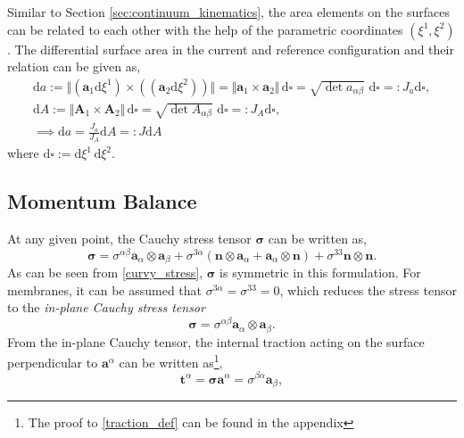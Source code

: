 \documentclass[../main.tex]{subfiles}
\begin{document}
Similar to Section \ref{sec:continuum_kinematics}, the area elements on the surfaces can be related to each other
 with the help of the parametric coordinates $(\xi^{1}, \xi^{2})$. The differential surface area in the current and reference configuration and their relation can be given as,
 \begin{gather} \label{area_something_man}
    \mathrm{d}a := \Vert (\boldsymbol{a}_{1} \mathrm{d}\xi^{1}) \times ((\boldsymbol{a}_{2} \mathrm{d}\xi^{2})) \Vert = \Vert \boldsymbol{a}_{1} \times \boldsymbol{a}_{2} \Vert\, \mathrm{d}\square = \sqrt{\det a_{\alpha \beta}}\,\, \mathrm{d}\square =: J_{a} \mathrm{d}\square,\\
    \mathrm{d}A := \Vert \boldsymbol{A}_{1} \times \boldsymbol{A}_{2} \Vert \, \mathrm{d}\square = \sqrt{\det A_{\alpha \beta}}\,\, \mathrm{d}\square =: J_{A} \mathrm{d}\square,\\    
    \implies \mathrm{d}a = \frac{J_{a}}{J_{A}} \mathrm{d}A =: J \mathrm{d}A
\end{gather}
 where $\mathrm{d} \square := \mathrm{d} \xi^{1} \, \mathrm{d} \xi^{2}$. 
\subsection{Momentum Balance}
At any given point, the Cauchy stress tensor $\boldsymbol{\sigma}$ can be written as,
\begin{equation}\label{curvy_stress}
    \boldsymbol{\sigma} = \sigma^{\alpha \beta} \boldsymbol{a}_{\alpha} \otimes \boldsymbol{a}_{\beta} + \sigma^{3\alpha}(\boldsymbol{n}
    \otimes \boldsymbol{a}_{\alpha} + \boldsymbol{a}_{\alpha} \otimes \boldsymbol{n}) + \sigma^{33} \boldsymbol{n} \otimes \boldsymbol{n}.
\end{equation}
As can be seen from \eqref{curvy_stress}, $\boldsymbol{\sigma}$ is symmetric in this formulation. For membranes, it can be assumed that $\sigma^{3\alpha} = \sigma^{33} = 0$,
 which reduces the stress tensor to the \emph{in-plane Cauchy stress tensor}
\begin{equation}\label{curvy_planar_stress}
    \boldsymbol{\sigma} = \sigma^{\alpha \beta} \boldsymbol{a}_{\alpha} \otimes \boldsymbol{a}_{\beta}.
\end{equation}
From the in-plane Cauchy tensor, the internal traction acting on the surface perpendicular to $\boldsymbol{a}^{\alpha}$ can be written as\footnote{The proof to \eqref{traction_def} can be found in the appendix},
\begin{equation}\label{traction_def}
    \boldsymbol{t}^{\alpha} = \boldsymbol{\sigma} \boldsymbol{a}^{\alpha} = \sigma^{\beta \alpha} \boldsymbol{a}_{\beta},
\end{equation}
\end{document}
